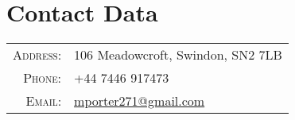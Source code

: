 \section{Contact Data}

\begin{tabular}{rl}
    \textsc{Address:}   & 106 Meadowcroft, Swindon, SN2 7LB \\
    \textsc{Phone:}     & +44 7446 917473 \\
    \textsc{Email:}     & \href{mailto:mporter271@gmail.com}{mporter271@gmail.com}
\end{tabular}